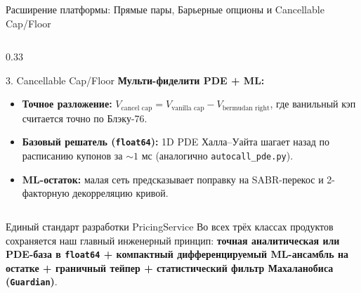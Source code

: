 \documentclass[aspectratio=169, 9pt]{beamer}
\begin{document}
\begin{frame}{Расширение платформы: Прямые пары, Барьерные опционы и Cancellable Cap/Floor}
\begin{columns}[T]
    \begin{column}{0.33\textwidth}
      \begin{block}{3. Cancellable Cap/Floor}
        \scriptsize
        \textbf{Мульти-фиделити PDE + ML:}
        \begin{itemize}
          \item \textbf{Точное разложение:} $V_{\text{cancel cap}} = V_{\text{vanilla cap}} - V_{\text{bermudan right}}$, где ванильный кэп считается точно по Блэку-76.
          \item \textbf{Базовый решатель (\texttt{float64}):} 1D PDE Халла--Уайта шагает назад по расписанию купонов за $\sim 1$ мс (аналогично \texttt{autocall\_pde.py}).
          \item \textbf{ML-остаток:} малая сеть предсказывает поправку на SABR-перекос и 2-факторную декорреляцию кривой.
        \end{itemize}
      \end{block}
    \end{column}
  \end{columns}

  \vspace{0.2cm}
  \begin{exampleblock}{Единый стандарт разработки PricingService}
    Во всех трёх классах продуктов сохраняется наш главный инженерный принцип: \textbf{точная аналитическая или PDE-база в \texttt{float64} + компактный дифференцируемый ML-ансамбль на остатке + граничный тейпер + статистический фильтр Махаланобиса (\texttt{Guardian})}.
  \end{exampleblock}
\end{frame}
\end{document}
